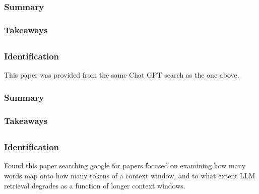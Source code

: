 \documentclass[
	letterpaper, %
]{jdf}
\begin{document}
\subsubsection{Summary}

\subsubsection{Takeaways}

\subsection{}
\subsubsection{Identification}
This paper was provided from the same Chat GPT search as the one above.

\subsubsection{Summary}

\subsubsection{Takeaways}

\subsection{}
\subsubsection{Identification}
Found this paper searching google for papers focused on examining how many words map onto how many tokens of a context window, and to what extent LLM retrieval degrades as a function of longer context windows.
\end{document}
